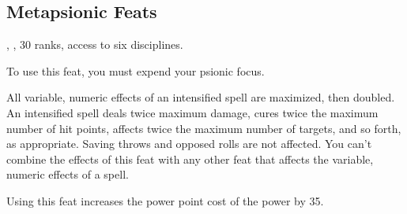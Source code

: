 \subsection{Metapsionic Feats}
{, ,  30 ranks, access to six disciplines.}
{To use this feat, you must expend your psionic focus.

All variable, numeric effects of an intensified spell are maximized, then doubled. An intensified spell deals twice maximum damage, cures twice the maximum number of hit points, affects twice the maximum number of targets, and so forth, as appropriate. Saving throws and opposed rolls are not affected. You can't combine the effects of this feat with any other feat that affects the variable, numeric effects of a spell.

Using this feat increases the power point cost of the power by 35.}


\clearpage


\clearpage

